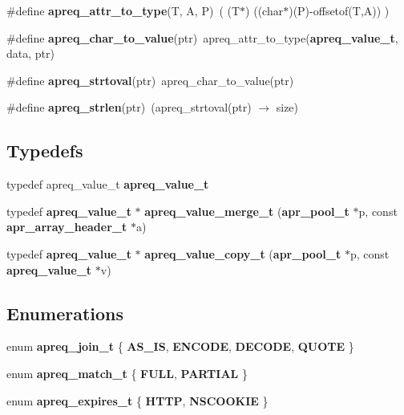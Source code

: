 \begin{CompactItemize}
\item 
{}
\#define {\bf apreq\_\-attr\_\-to\_\-type}(T, A, P)\ ( (T$\ast$) ((char$\ast$)(P)-offsetof(T,A)) )\label{apreq_8h_a32}

\item 
\#define {\bf apreq\_\-char\_\-to\_\-value}(ptr)\ apreq\_\-attr\_\-to\_\-type({\bf apreq\_\-value\_\-t}, data, ptr)
\item 
{}
\#define {\bf apreq\_\-strtoval}(ptr)\ apreq\_\-char\_\-to\_\-value(ptr)\label{apreq_8h_a34}

\item 
\#define {\bf apreq\_\-strlen}(ptr)\ (apreq\_\-strtoval(ptr) $\rightarrow$ size)
\end{CompactItemize}
\subsection*{Typedefs}
\begin{CompactItemize}
\item 
typedef apreq\_\-value\_\-t {\bf apreq\_\-value\_\-t}
\item 
{}
typedef {\bf apreq\_\-value\_\-t} $\ast$ {\bf apreq\_\-value\_\-merge\_\-t} ({\bf apr\_\-pool\_\-t} $\ast$p, const {\bf apr\_\-array\_\-header\_\-t} $\ast$a)\label{apreq_8h_a1}

\item 
{}
typedef {\bf apreq\_\-value\_\-t} $\ast$ {\bf apreq\_\-value\_\-copy\_\-t} ({\bf apr\_\-pool\_\-t} $\ast$p, const {\bf apreq\_\-value\_\-t} $\ast$v)\label{apreq_8h_a2}

\end{CompactItemize}
\subsection*{Enumerations}
\begin{CompactItemize}
\item 
enum {\bf apreq\_\-join\_\-t} \{ {\bf AS\_\-IS}, 
{\bf ENCODE}, 
{\bf DECODE}, 
{\bf QUOTE}
 \}
\item 
enum {\bf apreq\_\-match\_\-t} \{ {\bf FULL}, 
{\bf PARTIAL}
 \}
\item 
enum {\bf apreq\_\-expires\_\-t} \{ {\bf HTTP}, 
{\bf NSCOOKIE}
 \}
\end{CompactItemize}
